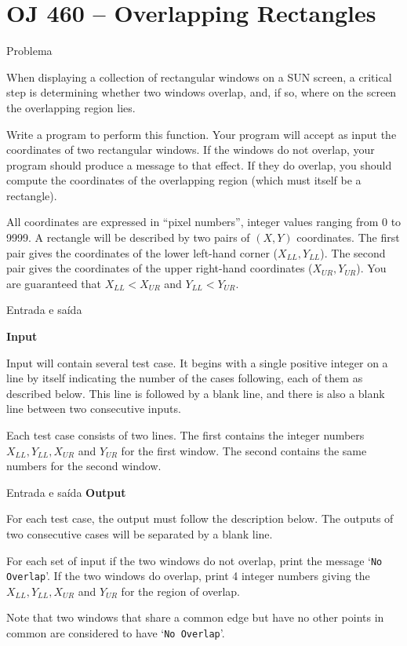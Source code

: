 \section{OJ 460 -- Overlapping Rectangles}

\begin{frame}[fragile]{Problema}

When displaying a collection of rectangular windows on a SUN screen, a critical step is 
determining whether two windows overlap, and, if so, where on the screen the overlapping region 
lies.

Write a program to perform this function. Your program will accept as input the coordinates of
two rectangular windows. If the windows do not overlap, your program should produce a message to
that effect. If they do overlap, you should compute the coordinates of the overlapping region 
(which must itself be a rectangle).

All coordinates are expressed in ``pixel numbers”, integer values ranging from 0 to 9999. A 
rectangle will be described by two pairs of $(X, Y)$ coordinates. The first pair gives the 
coordinates of the lower left-hand corner ($X_{LL}, Y_{LL}$). The second pair gives the 
coordinates of the upper right-hand coordinates
($X_{UR}, Y_{UR}$). You are guaranteed that $X_{LL} < X_{UR}$ and $Y_{LL} < Y_{UR}$.
\end{frame}

\begin{frame}[fragile]{Entrada e saída}

\textbf{Input}

Input will contain several test case. It begins with a single positive integer on a line by itself 
indicating the number of the cases following, each of them as described below. This line is 
followed by a blank line, and there is also a blank line between two consecutive inputs.

Each test case consists of two lines. The first contains the integer numbers $X_{LL}, Y_{LL}, X_{UR}$ and
$Y_{UR}$ for the first window. The second contains the same numbers for the second window.
\end{frame}

\begin{frame}[fragile]{Entrada e saída}
\textbf{Output}

For each test case, the output must follow the description below. The outputs of two consecutive 
cases will be separated by a blank line.

For each set of input if the two windows do not overlap, print the message `\texttt{No Overlap}’. 
If the two windows do overlap, print 4 integer numbers giving the $X_{LL}, Y_{LL}, X_{UR}$ and 
$Y_{UR}$ for the region of overlap.

Note that two windows that share a common edge but have no other points in common are considered
to have `\texttt{No Overlap}’.

\end{frame}

